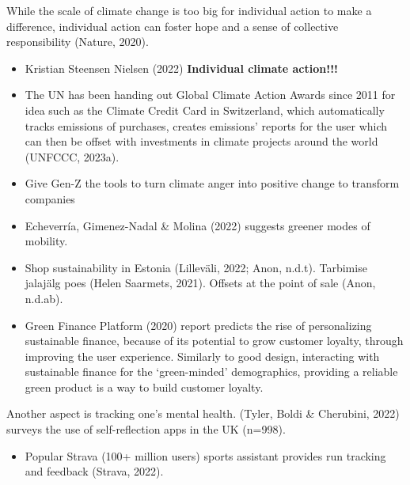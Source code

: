 \documentclass[
  letterpaper,
  DIV=11,
  numbers=noendperiod]{scrartcl}
\providecommand{\tightlist}{%
  \setlength{\itemsep}{0pt}\setlength{\parskip}{0pt}}\usepackage{longtable,booktabs,array}
\begin{document}
While the scale of climate change is too big for individual action to
make a difference, individual action can foster hope and a sense of
collective responsibility (Nature, 2020).

\begin{itemize}
\item
  Kristian Steensen Nielsen (2022) \textbf{Individual climate action!!!}
\item
  The UN has been handing out Global Climate Action Awards since 2011
  for idea such as the Climate Credit Card in Switzerland, which
  automatically tracks emissions of purchases, creates emissions'
  reports for the user which can then be offset with investments in
  climate projects around the world (UNFCCC, 2023a).
\item
  Give Gen-Z the tools to turn climate anger into positive change to
  transform companies
\item
  Echeverría, Gimenez-Nadal \& Molina (2022) suggests greener modes of
  mobility.
\item
  Shop sustainability in Estonia (Lilleväli, 2022; Anon, n.d.t).
  Tarbimise jalajälg poes (Helen Saarmets, 2021). Offsets at the point
  of sale (Anon, n.d.ab).
\item
  Green Finance Platform (2020) report predicts the rise of
  personalizing sustainable finance, because of its potential to grow
  customer loyalty, through improving the user experience. Similarly to
  good design, interacting with sustainable finance for the
  `green-minded' demographics, providing a reliable green product is a
  way to build customer loyalty.
\end{itemize}

Another aspect is tracking one's mental health. (Tyler, Boldi \&
Cherubini, 2022) surveys the use of self-reflection apps in the UK
(n=998).

\begin{itemize}
\tightlist
\item
  Popular Strava (100+ million users) sports assistant provides run
  tracking and feedback (Strava, 2022).
\end{itemize}
\end{document}
